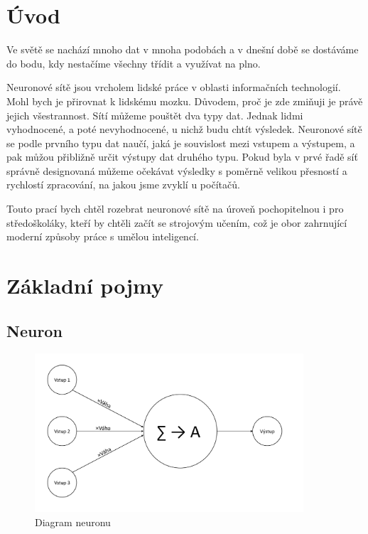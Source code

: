 \documentclass[12pt,a4paper]{report}
\begin{document}


\tableofcontents

\chapter{Úvod}
Ve světě se nachází mnoho dat v mnoha podobách a v dnešní době se dostáváme do bodu, kdy nestačíme všechny třídit a využívat na plno.

Neuronové sítě jsou vrcholem lidské práce v oblasti informačních technologií. Mohl bych je přirovnat k lidskému mozku. Důvodem, proč je zde zmiňuji je právě jejich všestrannost. Sítí můžeme pouštět dva typy dat. Jednak lidmi vyhodnocené, a poté nevyhodnocené, u nichž budu chtít výsledek. Neuronové sítě se podle prvního typu dat naučí, jaká je souvislost mezi vstupem a výstupem, a pak můžou přibližně určit výstupy dat druhého typu. Pokud byla v prvé řadě síť správně designovaná můžeme očekávat výsledky s poměrně velikou přesností a rychlostí zpracování, na jakou jsme zvyklí u počítačů.

Touto prací bych chtěl rozebrat neuronové sítě na úroveň pochopitelnou i pro středoškoláky, kteří by chtěli začít se strojovým učením, což je obor zahrnující moderní způsoby práce s umělou inteligencí.

\chapter{Základní pojmy} %

\section{Neuron}
	\begin{figure}[h]
		\centering
		\includegraphics[width=10cm]{images/neuron}
		\caption{Diagram neuronu}
	\end{figure}
\end{document}
